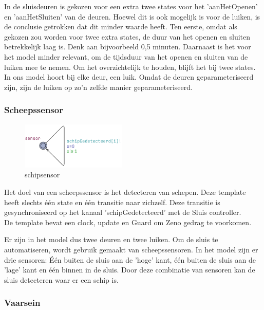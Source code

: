 \documentclass{article} %
\begin{document}
In de sluisdeuren is gekozen voor een extra twee states voor het 'aanHetOpenen' en 'aanHetSluiten' van de deuren. Hoewel dit is ook mogelijk is voor de luiken, is de conclusie getrokken dat dit minder waarde heeft. Ten eerste, omdat als gekozen zou worden voor twee extra states, de duur van het openen en sluiten betrekkelijk laag is. Denk aan bijvoorbeeld 0,5 minuten. Daarnaast is het voor het model minder relevant, om de tijdsduur van het openen en sluiten van de luiken mee te nemen. Om het overzichtelijk te houden, blijft het bij twee states. \\
In ons model hoort bij elke deur, een luik. Omdat de deuren geparameteriseerd zijn, zijn de luiken op zo'n zelfde manier geparameteriseerd.

\subsubsection{Scheepssensor}

\begin{figure}[h]
\includegraphics[width=5cm]{schipsensor.png}
\centering    
\caption{schipsensor}
\end{figure}

Het doel van een scheepssensor is het detecteren van schepen. Deze template heeft slechts één state en één transitie naar zichzelf. Deze transitie is gesynchroniseerd op het kanaal 'schipGedetecteerd' met de Sluis controller. \\
De template bevat een clock, update en Guard om Zeno gedrag te voorkomen. \par

Er zijn in het model dus twee deuren en twee luiken. Om de sluis te automatiseren, wordt gebruik gemaakt van scheepssensoren. In het model zijn er drie sensoren: Één buiten de sluis aan de 'hoge' kant, één buiten de sluis aan de 'lage' kant en één binnen in de sluis. Door deze combinatie van sensoren kan de sluis detecteren waar er een schip is. 

\newpage

\subsubsection{Vaarsein}
\end{document}
